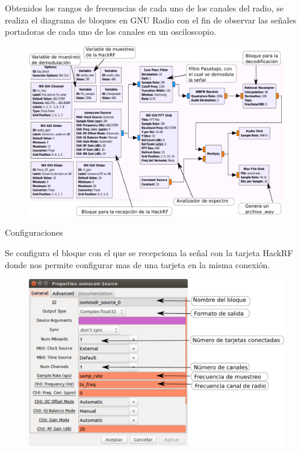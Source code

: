 \begin{frame}{}

Obtenidos los rangos de frecuencias de cada uno de los canales del radio, se realiza el diagrama de bloques en GNU Radio con el fin de observar las señales portadoras de cada uno de los canales en un osciloscopio.

\begin{figure}[H]
\centering
\vspace{-3mm}
\includegraphics[width=.9\textwidth]{parte3/lab10/pdf/lab10_7.pdf}
\end{figure}

\end{frame}

\begin{frame}{Configuraciones}

Se configura el bloque con el que se recepciona la señal con la tarjeta HackRF donde nos permite configurar mas de una tarjeta en la misma conexión.

\begin{figure}[H]
\centering
\vspace{-3mm}
\includegraphics[width=.8\textwidth]{parte3/lab10/pdf/lab10_8.pdf}
\end{figure}

\end{frame}

